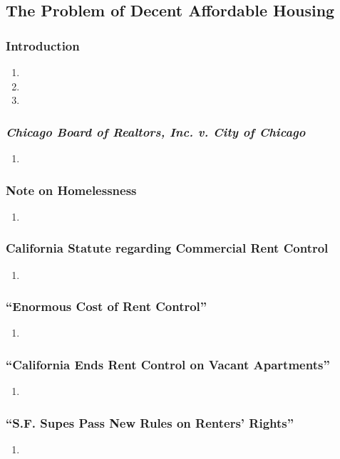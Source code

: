 \subsection{The Problem of Decent Affordable Housing} %

\subsubsection{Introduction} %

\begin{enumerate}
    \item %
    \item %
    \item %
\end{enumerate}

\subsubsection{\emph{Chicago Board of Realtors, Inc. v. City of Chicago}}

\begin{enumerate}
    \item 
\end{enumerate}

\subsubsection{Note on Homelessness}

\begin{enumerate}
    \item 
\end{enumerate}

\subsubsection{California Statute regarding Commercial Rent Control}

\begin{enumerate}
    \item 
\end{enumerate}

\subsubsection{``Enormous Cost of Rent Control''}

\begin{enumerate}
    \item 
\end{enumerate}

\subsubsection{``California Ends Rent Control on Vacant Apartments''}

\begin{enumerate}
    \item 
\end{enumerate}

\subsubsection{``S.F. Supes Pass New Rules on Renters' Rights''}

\begin{enumerate}
    \item 
\end{enumerate}
